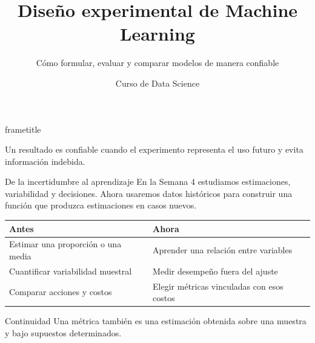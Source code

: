 \documentclass[aspectratio=169,10pt]{beamer}
\title[Data Science · Clase 5]{Diseño experimental de Machine Learning}
\subtitle{Cómo formular, evaluar y comparar modelos de manera confiable}
\author{Curso de Data Science}
\institute{Semana 5 · Clase 5}
\date{}
\begin{document}
\begin{frame}[plain]
  \begin{beamercolorbox}[wd=\paperwidth,ht=\paperheight,sep=2em]{frametitle}
    \vfill
    {\Huge\inserttitle\par}
    \vspace{.45em}
    {\Large\insertsubtitle\par}
    \vspace{1.1em}
    \par
    \vspace{.7em}
    {\color{white}\small Un resultado es confiable cuando el experimento representa el uso futuro y evita información indebida.\par}
    \vfill
    {\color{UAPGold}\large\insertauthor\par}
    {\color{white}\insertinstitute\par}
  \end{beamercolorbox}
\end{frame}

\begin{frame}{De la incertidumbre al aprendizaje}
  \small
  En la Semana 4 estudiamos estimaciones, variabilidad y decisiones. Ahora usaremos datos históricos para construir una función que produzca estimaciones en casos nuevos.
  \vspace{.4em}
  \begin{tabularx}{\textwidth}{X X}
    \toprule Antes & Ahora \\ \midrule
    Estimar una proporción o una media & Aprender una relación entre variables \\
    Cuantificar variabilidad muestral & Medir desempeño fuera del ajuste \\
    Comparar acciones y costos & Elegir métricas vinculadas con esos costos \\
    \bottomrule
  \end{tabularx}
  \begin{block}{Continuidad}
    Una métrica también es una estimación obtenida sobre una muestra y bajo supuestos determinados.
  \end{block}
\end{frame}
\end{document}
